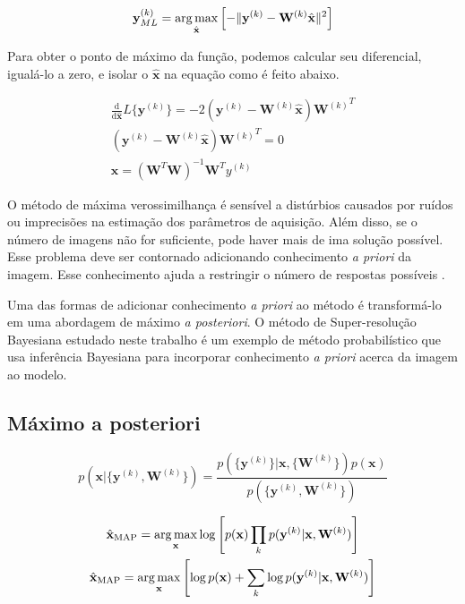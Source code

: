 \begin{equation}
	\label{eq:maxlhood}
	\mathbf{y}^{(k)}_{ML} = \operatorname*{arg\,max}_{\hat{\mathbf{x}}}
	\left[-\|\mathbf{y}^{(k)} - \mathbf{W}^{(k)}\hat{\mathbf{x}}\|^2 
	\right ]
\end{equation}

Para obter o ponto de máximo da função, podemos calcular seu diferencial, igualá-lo a zero, e isolar o $\hat{\mathbf{x}}$ na equação como é feito abaixo.

\begin{gather}
	\frac{\mathrm{d}}{\mathrm{d} \hat{\mathbf{x}}}
	L\{\mathbf{y}^{(k)}\} = -2 (\mathbf{y}^{(k)} - \mathbf{W}^{(k)}\hat{\mathbf{x}}) {\mathbf{W}^{(k)}}^T \\
	(\mathbf{y}^{(k)} - \mathbf{W}^{(k)}\hat{\mathbf{x}}) {\mathbf{W}^{(k)}}^T = 0 \\
	\hat{\mathbf{x}} = (\mathbf{W}^T\mathbf{W})^{-1} \mathbf{W}^T y^{(k)}
\end{gather}

O método de máxima verossimilhança é sensível a distúrbios causados por ruídos ou
imprecisões na estimação dos parâmetros de aquisição.
Além disso, se o número de imagens não for suficiente, pode haver mais de ima solução
possível. Esse problema deve ser contornado adicionando conhecimento \emph{a priori} da
imagem.
Esse conhecimento ajuda a restringir o número de respostas possíveis \cite{nasrollahi2014super}.

Uma das formas de adicionar conhecimento \emph{a priori} ao método é transformá-lo em
uma abordagem de máximo \emph{a posteriori}.
O método de Super-resolução Bayesiana estudado neste trabalho é um exemplo de método probabilístico que usa inferência Bayesiana para incorporar conhecimento \emph{a priori} acerca da imagem ao modelo.

\subsection{Máximo a posteriori}

\begin{equation}
	p(\mathbf{x} | \{\mathbf{y}^{(k)}, \mathbf{W}^{(k)}\}) = \frac{p(\{\mathbf{y}^{(k)}\} | \mathbf{x}, \{\mathbf{W}^{(k)}\}) p(\mathbf{x})}
	{p(\{\mathbf{y}^{(k)}, \mathbf{W}^{(k)}\})}
\end{equation}

\begin{gather}
	\hat{\mathbf{x}}_{\mathrm{MAP}} = \operatorname*{arg\,max}_{\mathbf{x}} \log \left[ p(\mathbf{x}) \prod_k p(\mathbf{y}^{(k)} | \mathbf{x}, \mathbf{W}^{(k)}) \right] \\
	\hat{\mathbf{x}}_{\mathrm{MAP}} = \operatorname*{arg\,max}_{\mathbf{x}} \left[ \log p(\mathbf{x}) + \sum_k \log p(\mathbf{y}^{(k)} | \mathbf{x}, \mathbf{W}^{(k)}) \right]
\end{gather}




